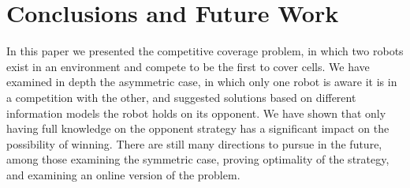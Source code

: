 \documentclass[letterpaper, 10 pt, conference]{ieeeconf}  %
\theoremstyle{definition}
\newcommand{\ltr}{{{\sf{LTR}}}\xspace}
\begin{document}
\addtolength{\textheight}{-0.9cm}   %













\section{Conclusions and Future Work}
In this paper we presented the competitive coverage problem, in which two robots exist in an environment and compete to be the first to cover cells. We have examined in depth the asymmetric case, in which only one robot is aware it is in a competition with the other, and suggested solutions based on different information models the robot holds on its opponent. We have shown that only having full knowledge on the opponent strategy has a significant impact on the possibility of winning. There are still many directions to pursue in the future, among those examining the symmetric case, proving optimality of the \ltr strategy, and examining an online version of the problem.





\end{document}
